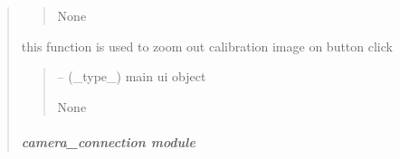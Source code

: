\documentclass[letterpaper,10pt,english]{sphinxmanual}
\begin{document}
\begin{quote}
\begin{savenotes}
\begin{fulllineitems}
\begin{quote}
\begin{description}
\sphinxAtStartPar
None

\end{description}\end{quote}

\end{fulllineitems}\end{savenotes}


\begin{savenotes}\begin{fulllineitems}
\label{\detokenize{setting/backend/camera_funcs:oxin.backend.camera_funcs.zoom_out_calibration_image}}
\pysigstartsignatures
{}
\pysigstopsignatures
\sphinxAtStartPar
this function is used to zoom out calibration image on button click
\begin{quote}\begin{description}
\sphinxAtStartPar
{} – (\_type\_) main ui object

\sphinxAtStartPar
None

\end{description}\end{quote}

\end{fulllineitems}\end{savenotes}


\sphinxstepscope


\subparagraph{camera\_connection module}
\label{\detokenize{setting/backend/camera_connection:module-oxin.backend.camera_connection}}\label{\detokenize{setting/backend/camera_connection:camera-connection-module}}\label{\detokenize{setting/backend/camera_connection::doc}}


\end{quote}
\end{document}

